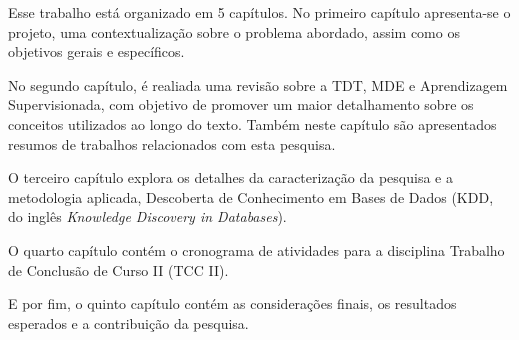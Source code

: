 Esse trabalho está organizado em 5 capítulos. No primeiro capítulo apresenta-se
o projeto, uma contextualização sobre o problema abordado, assim como os
objetivos gerais e específicos.

No segundo capítulo, é realiada uma revisão sobre a TDT, MDE e Aprendizagem
Supervisionada, com objetivo de promover um maior detalhamento sobre os
conceitos utilizados ao longo do texto. Também neste capítulo são apresentados
resumos de trabalhos relacionados com esta pesquisa.

O terceiro capítulo explora os detalhes da caracterização da pesquisa e a
metodologia aplicada, Descoberta de Conhecimento em Bases de Dados (KDD, do
inglês \textit{Knowledge Discovery in Databases}).

O quarto capítulo contém o cronograma de atividades para a disciplina Trabalho
de Conclusão de Curso II (TCC II).

E por fim, o quinto capítulo contém as considerações finais, os resultados
esperados e a contribuição da pesquisa.
